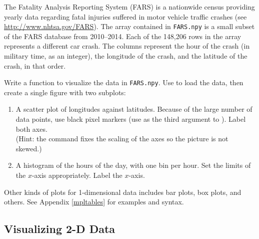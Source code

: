 \begin{problem} %
The Fatality Analysis Reporting System (FARS) is a nationwide census providing yearly data regarding fatal injuries suffered in motor vehicle traffic crashes (see \url{http://www.nhtsa.gov/FARS}).
The array contained in \texttt{FARS.npy} is a small subset of the FARS database from 2010--2014.
Each of the 148,206 rows in the array represents a different car crash.
The columns represent the hour of the crash (in military time, as an integer), the longitude of the crash, and the latitude of the crash, in that order.

Write a function to visualize the data in \texttt{FARS.npy}.
Use  to load the data, then create a single figure with two subplots:
%
\begin{enumerate}
\item A scatter plot of longitudes against latitudes.
Because of the large number of data points, use black pixel markers (use  as the third argument to ).
Label both axes.
\\
(Hint: the command  fixes the scaling of the axes so the picture is not skewed.)

\item A histogram of the hours of the day, with one bin per hour.
Set the limits of the $x$-axis appropriately.
Label the $x$-axis.
\end{enumerate}
\end{problem}

Other kinds of plots for 1-dimensional data includes bar plots, box plots, and others.
See Appendix \ref{mpltables} for examples and syntax.

\subsection*{Visualizing 2-D Data} %

